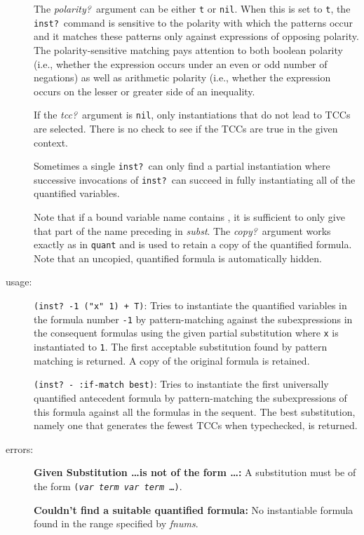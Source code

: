 \documentclass[12pt]{book}
\makeatletter
\newcommand{\indtt}[1]{\texttt{#1}\index{#1@{\texttt{#1}}}}  %
\makeatother
\begin{document}
\begin{description}
The \emph{polarity?}\ argument can be either \texttt{t} or \texttt{nil}\@.
When this is set to \texttt{t}, the \texttt{inst?}\ command is sensitive
to the polarity with which the patterns occur and it matches these
patterns only against expressions of opposing polarity.  The
polarity-sensitive matching pays attention to both boolean polarity (i.e.,
whether the expression occurs under an even or odd number of negations) as
well as arithmetic polarity (i.e., whether the expression occurs on the
lesser or greater side of an inequality.

If the \emph{tcc?}\ argument is \texttt{nil}, only instantiations that do
not lead to TCCs are selected.  There is no check to see if the TCCs are
true in the given context.

Sometimes a single \indtt{inst?}\ can only find a partial
instantiation where successive invocations of \indtt{inst?}\ 
can succeed in fully instantiating all of the quantified variables.

Note that if a bound variable name contains \texttt{}, it is
sufficient to only give that part of the name preceding \texttt{} in \emph{subst}.  The \emph{copy?}\ argument works exactly as in \indtt{quant} and
is used to retain a copy of the quantified formula.  Note that an
uncopied, quantified formula is automatically hidden.

\item[usage: ] \texttt{(inst?\ -1 ("x" 1) + T)}: Tries to instantiate the
quantified variables in the formula number \texttt{-1} by pattern-matching
against the subexpressions in the consequent formulas using
the given partial substitution where \texttt{x} is instantiated to \texttt{1}.
The first acceptable substitution found by pattern matching is returned.
A copy of the original formula is retained.

\texttt{(inst?\ - :if-match best)}: Tries to instantiate the first universally
quantified antecedent formula by pattern-matching the subexpressions
of this formula against all the formulas in the sequent.  
The best substitution, namely one that generates the fewest TCCs when
typechecked, is returned.

\item[errors: ] {\bf Given Substitution \ldots is not of the form \ldots:}
A substitution 
must be of the form \texttt{(\emph{var} \emph{term} \emph{var} \emph{term} \ldots)}.

{\bf Couldn't find a suitable quantified formula:}  No instantiable
formula found in the range specified by \emph{fnums}.


\end{description}
\end{document}
